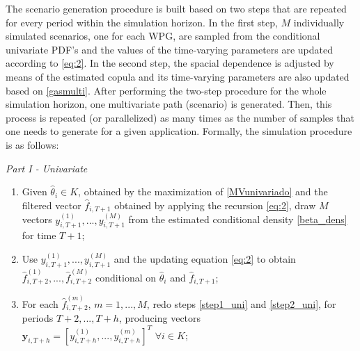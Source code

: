 \documentclass[a4paper]{IEEEtran}
\begin{document}
The scenario generation procedure is built based on two steps that are repeated for every period within the simulation horizon. In the first step, $M$ individually simulated scenarios, one for each WPG, are sampled from the conditional univariate PDF's and the values of the time-varying parameters are updated according to \eqref{eq:2}. In the second step, the spacial dependence is adjusted by means of the estimated copula and its time-varying parameters are also updated based on \eqref{gasmulti}. After performing the two-step procedure for the whole simulation horizon, one multivariate path (scenario) is generated. Then, this process is repeated (or parallelized) as many times as the number of samples that one needs to generate for a given application. Formally, the simulation procedure is as follows:




\emph{Part I - Univariate}
\begin{enumerate}\label{univariate_modelling}

\item Given $\hat{\theta}_i \in K$, obtained by the maximization of \eqref{MVunivariado} and the filtered vector $\hat{f}_{i,T+1}$ obtained by applying the recursion \eqref{eq:2}, draw $M$ vectors ${y}_{i,T+1}^{(1)},...,{y}_{i,T+1}^{(M)}$ from the estimated conditional density \eqref{beta_dens} for time $T+1$;  \label{step1_uni}

\item Use ${y}_{i,T+1}^{(1)},...,{y}_{i,T+1}^{(M)}$ and the updating equation \eqref{eq:2} to obtain $\hat{f}_{i,T+2}^{(1)},...,\hat{f}_{i,T+2}^{(M)}$ conditional on $\hat{\theta}_i$ and $\hat{f}_{i,T+1}$; \label{step2_uni}

\item For each $\hat{f}_{i,T+2}^{(m)}$, $m=1,...,M$, redo steps \ref{step1_uni} and \ref{step2_uni}, for periods $T+2,...,T+h$, producing vectors $\mathbf{y}_{i,T+h} = [{y}_{i,T+h}^{(1)},...,{y}_{i,T+h}^{(m)}]^T\,\, \forall i \in K$; \label{step3_uni}

\end{enumerate}
\end{document}
